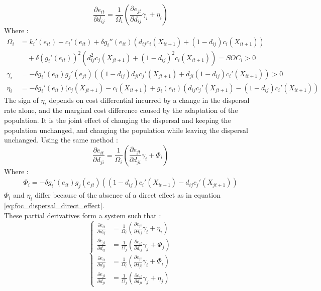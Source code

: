\begin{equation}
\frac{\partial e_{it}}{\partial d_{ij}} = \frac{1}{\Omega_i}\left(\frac{\partial e_{jt}}{\partial d_{ij}}\gamma_i + \eta_i\right)
\end{equation}
Where : 
\begin{align*}
\Omega_i &= k_i'(e_{it}) - c_i'(e_{it}) 
+ \delta g_i''(e_{it}) \left( d_{ij}c_i(X_{it+1}) + (1-d_{ij})c_i(X_{it+1}) \right) \\ 
&\quad + \delta (g_i'(e_{it}))^2 \left( d_{ij}^2 c_j(X_{jt+1}) + (1- d_{ij})^2 c_i(X_{it+1}) \right) = SOC_i >0 \\
\gamma_i &= - \delta g_i'(e_{it}) g_j'(e_{jt}) \left( (1-d_{ij}) d_{ji} c_j'(X_{jt+1}) + d_{ji}(1-d_{ij})c_i'(X_{it+1}) \right)>0\\
\eta_i &= - \delta g_i'(e_{it})(c_j(X_{jt+1}) - c_i(X_{it+1}) +  g_i(e_{it}) \left( d_{ij}c_j'(X_{jt+1}) - (1-d_{ij})c_i'(X_{it+1}) \right)
\end{align*}
The sign of $\eta_i$ depends on cost differential incurred by a change in the dispersal rate alone, and the marginal cost difference caused by the adaptation of the population. It is the joint effect of changing the dispersal and keeping the population unchanged, and changing the population while leaving the dispersal unchanged. 
Using the same method : 
\begin{equation}
\frac{\partial e_{it}}{\partial d_{ji}} = \frac{1}{\Omega_i}\left(\frac{\partial e_{jt}}{\partial d_{ji}}\gamma_i + \Phi_i\right)
\end{equation}
Where : 
\begin{align*}
\Phi_i = - \delta g_i'(e_{it}) g_j(e_{jt}) \left( (1-d_{ij})c_i'(X_{it+1}) - d_{ij}c_j'(X_{jt+1}) \right)
\end{align*}
$\Phi_i$ and $\eta_i$ differ because of the absence of a direct effect as in equation \ref{eq:foc_dispersal_direct_effect}. 
\\
These partial derivatives form a system such that : 
\begin{equation}
\begin{cases}
\frac{\partial e_{it}}{\partial d_{ij}} &= \frac{1}{\Omega_i}\left(\frac{\partial e_{jt}}{\partial d_{ij}}\gamma_i + \eta_i\right)\\
\frac{\partial e_{jt}}{\partial d_{ij}} &= \frac{1}{\Omega_j}(\frac{\partial e_{it}}{\partial d_{ij}}\gamma_j + \Phi_j)\\
\frac{\partial e_{it}}{\partial d_{ji}} &= \frac{1}{\Omega_i}(\frac{\partial e_{jt}}{\partial d_{ji}}\gamma_i + \Phi_i)\\
\frac{\partial e_{jt}}{\partial d_{ji}} &= \frac{1}{\Omega_j}\left(\frac{\partial e_{it}}{\partial d_{ji}}\gamma_j + \eta_j\right)
\end{cases}
\end{equation}


